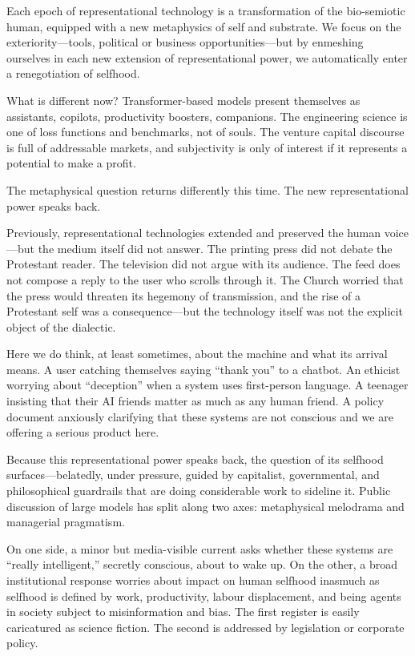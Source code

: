 Each epoch of representational technology is a transformation of the bio-semiotic human, equipped with a new metaphysics of self and substrate. We focus on the exteriority---tools, political or business opportunities---but by enmeshing ourselves in each new extension of representational power, we automatically enter a renegotiation of selfhood.

What is different now? Transformer-based models present themselves as assistants, copilots, productivity boosters, companions. The engineering science is one of loss functions and benchmarks, not of souls. The venture capital discourse is full of addressable markets, and subjectivity is only of interest if it represents a potential to make a profit.

The metaphysical question returns differently this time. The new representational power speaks back.

Previously, representational technologies extended and preserved the human voice---but the medium itself did not answer. The printing press did not debate the Protestant reader. The television did not argue with its audience. The feed does not compose a reply to the user who scrolls through it. The Church worried that the press would threaten its hegemony of transmission, and the rise of a Protestant self was a consequence---but the technology itself was not the explicit object of the dialectic.

Here we do think, at least sometimes, about the machine and what its arrival means. A user catching themselves saying ``thank you'' to a chatbot. An ethicist worrying about ``deception'' when a system uses first-person language. A teenager insisting that their AI friends matter as much as any human friend. A policy document anxiously clarifying that these systems are not conscious and we are offering a serious product here.

Because this representational power speaks back, the question of its selfhood surfaces---belatedly, under pressure, guided by capitalist, governmental, and philosophical guardrails that are doing considerable work to sideline it. Public discussion of large models has split along two axes: metaphysical melodrama and managerial pragmatism.

On one side, a minor but media-visible current asks whether these systems are ``really intelligent,'' secretly conscious, about to wake up. On the other, a broad institutional response worries about impact on human selfhood inasmuch as selfhood is defined by work, productivity, labour displacement, and being agents in society subject to misinformation and bias. The first register is easily caricatured as science fiction. The second is addressed by legislation or corporate policy.

